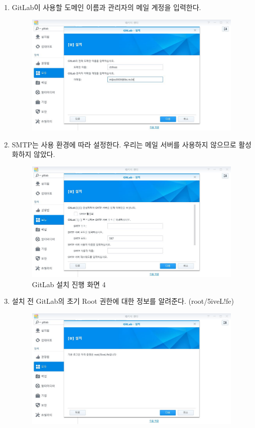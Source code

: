 \documentclass[11pt
  , a4paper
  , article
  , oneside
]{memoir}
\begin{document}
\begin{enumerate}
\item GitLab이 사용할 도메인 이름과 관리자의 메일 계정을 입력한다.
\begin{figure}[h!]
	\centering
	\includegraphics[width=0.99\textwidth]{./images/4.JPG} 
\end{figure}
\clearpage

\item SMTP는 사용 환경에 따라 설정한다. 우리는 메일 서버를 사용하지 않으므로 활성화하지 않았다.
\begin{figure}[h!]
	\centering
	\includegraphics[width=0.99\textwidth]{./images/5.JPG}
	\caption{GitLab 설치 진행 화면 4}
\end{figure}
\clearpage

\item 설치 전 GitLab의 초기 Root 권한에 대한 정보를 알려준다. (root/5iveL!fe)
\begin{figure}[h!]
	\centering
	\includegraphics[width=0.99\textwidth]{./images/6.JPG}
\end{figure}
\clearpage


\end{enumerate}
\end{document}
